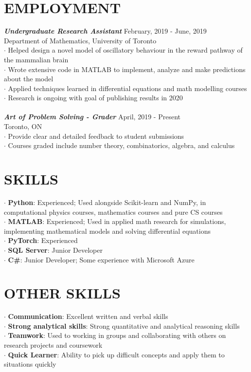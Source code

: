\documentclass[margin]{res}
\begin{document}
\begin{resume}
\section{EMPLOYMENT}
{\sl \textbf{Undergraduate Research Assistant}} \hfill February, 2019 - June, 2019 \\
Department of Mathematics, University of Toronto  \\ 
$\cdot$ Helped design a novel model of oscillatory behaviour in the    reward pathway of the mammalian brain\\ 
$\cdot$ Wrote extensive code in MATLAB to implement, analyze and make predictions about the model\\
$\cdot$ Applied techniques learned in differential equations and math modelling courses \\
$\cdot$ Research is ongoing with goal of publishing results in 2020\\
\\
{\sl \textbf{Art of Problem Solving - Grader}} \hfill April, 2019 - Present \\
Toronto, ON \\
$\cdot$ Provide clear and detailed feedback to student submissions\\
$\cdot$ Courses graded include number theory, combinatorics, algebra, and calculus 

\section{SKILLS}
    $\cdot$ \textbf{Python}: Experienced; Used alongside Scikit-learn and NumPy, in computational physics courses, mathematics courses and pure CS courses\\
    $\cdot$ \textbf{MATLAB}: Experienced; Used in applied math research for simulations, implementing mathematical models and solving differential equations\\
    $\cdot$ \textbf{PyTorch}: Experienced\\
    $\cdot$ \textbf{SQL Server}: Junior Developer\\
    $\cdot$ \textbf{C\#}: Junior Developer; Some experience with Microsoft Azure
\section{OTHER SKILLS}
    $\cdot$ \textbf{Communication}: Excellent written and verbal skills\\
    $\cdot$ \textbf{Strong analytical skills}: Strong quantitative and analytical reasoning skills\\
    $\cdot$ \textbf{Teamwork}: Used to working in groups and collaborating with others on research projects and coursework \\
    $\cdot$ \textbf{Quick Learner}: Ability to pick up difficult concepts and apply them to situations quickly\\
\end{resume}
\end{document}
